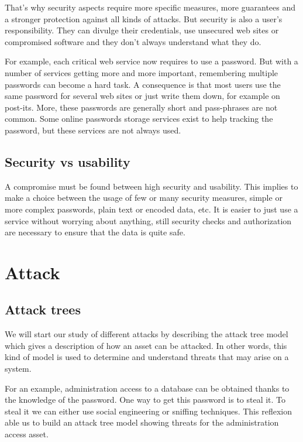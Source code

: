 That's why security aspects require more specific measures, more guarantees and
a stronger protection against all kinds of attacks. But security is also a user's
responsibility. They can divulge their credentials, use unsecured web sites or
compromised software and they don't always understand what they do.

For example, each critical web service now requires to use a password.
But with a number of services getting more and more important, remembering
multiple passwords can become a hard task. A consequence is that most users use
the same password for several web sites or just write them down, for example
on post-its. More, these passwords are generally short and pass-phrases are
not common.
Some online passwords storage services exist to help tracking the password, but
these services are not always used.

\subsection{Security vs usability}

A compromise must be found between high security and usability.
This implies to make a choice between the usage of few or many security
measures, simple or more complex passwords, plain text or encoded data, etc.
It is easier to just use a service without worrying about anything, still
security checks and authorization are necessary to ensure that the data is
quite safe.

\section{Attack}

\subsection{Attack trees}
We will start our study of different attacks by describing the attack tree model
which gives a description of how an asset can be attacked. In other words, this
kind of model is used to determine and understand threats that may arise on a
system.

For an example, administration access to a database can be obtained
thanks to the knowledge of the password. One way to get this password is to
steal it. To steal it we can either use social engineering or sniffing
techniques. This reflexion able us to build an attack tree model showing threats
for the administration access asset.

